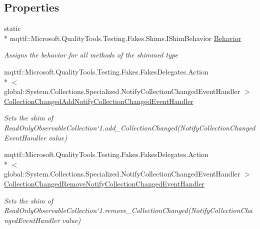 \subsection*{Properties}
\begin{DoxyCompactItemize}
\item 
static \\*
mqttf\-::\-Microsoft.\-Quality\-Tools.\-Testing.\-Fakes.\-Shims.\-I\-Shim\-Behavior \hyperlink{class_system_1_1_collections_1_1_object_model_1_1_fakes_1_1_shim_read_only_observable_collection_3_01_t_01_4_afb12bd34b4055cc0da7ae97ad14c87ca}{Behavior}
\begin{DoxyCompactList}\small\item\em Assigns the behavior for all methods of the shimmed type\end{DoxyCompactList}\item 
mqttf\-::\-Microsoft.\-Quality\-Tools.\-Testing.\-Fakes.\-Fakes\-Delegates.\-Action\\*
$<$ global\-::\-System.\-Collections.\-Specialized.\-Notify\-Collection\-Changed\-Event\-Handler $>$ \hyperlink{class_system_1_1_collections_1_1_object_model_1_1_fakes_1_1_shim_read_only_observable_collection_3_01_t_01_4_a461ae34259eb7b8ee10bee46b268f432}{Collection\-Changed\-Add\-Notify\-Collection\-Changed\-Event\-Handler}
\begin{DoxyCompactList}\small\item\em Sets the shim of Read\-Only\-Observable\-Collection`1.add\-\_\-\-Collection\-Changed(\-Notify\-Collection\-Changed\-Event\-Handler value)\end{DoxyCompactList}\item 
mqttf\-::\-Microsoft.\-Quality\-Tools.\-Testing.\-Fakes.\-Fakes\-Delegates.\-Action\\*
$<$ global\-::\-System.\-Collections.\-Specialized.\-Notify\-Collection\-Changed\-Event\-Handler $>$ \hyperlink{class_system_1_1_collections_1_1_object_model_1_1_fakes_1_1_shim_read_only_observable_collection_3_01_t_01_4_acd16a83703e7abd470464c8914d64e99}{Collection\-Changed\-Remove\-Notify\-Collection\-Changed\-Event\-Handler}
\begin{DoxyCompactList}\small\item\em Sets the shim of Read\-Only\-Observable\-Collection`1.remove\-\_\-\-Collection\-Changed(\-Notify\-Collection\-Changed\-Event\-Handler value)\end{DoxyCompactList}\item 

\end{DoxyCompactItemize}
